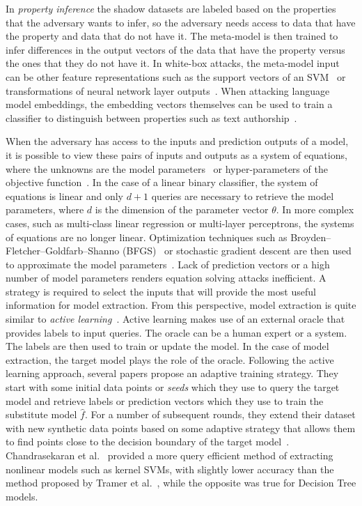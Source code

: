 In \textit{property inference} the shadow datasets are labeled based on the properties that the adversary wants to infer, so the adversary needs access to data that have the property and data that do not have it. The meta-model is then trained to infer differences in the output vectors of the data that have the property versus the ones that they do not have it. In white-box attacks, the meta-model input can be other feature representations such as the support vectors of an SVM~ or transformations of neural network layer outputs~. When attacking language model embeddings, the embedding vectors themselves can be used to train a classifier to distinguish between properties such as text authorship~.

When the adversary has access to the inputs and prediction outputs of a model, it is possible to view these pairs of inputs and outputs as a system of equations, where the unknowns are the model parameters~ or hyper-parameters of the objective function~. In the case of a linear binary classifier, the system of equations is linear and only $d + 1$ queries are necessary to retrieve the model parameters, where $d$ is the dimension of the parameter vector $\theta$. In more complex cases, such as multi-class linear regression or multi-layer perceptrons, the systems of equations are no longer linear. Optimization techniques such as Broyden–Fletcher–Goldfarb–Shanno (BFGS)~ or stochastic gradient descent are then used to approximate the model parameters~. 
Lack of prediction vectors or a high number of model parameters renders equation solving attacks inefficient. A strategy is required to select the inputs that will provide the most useful information for model extraction. From this perspective, model extraction is quite similar to \textit{active learning}~. Active learning makes use of an external 
oracle that provides labels to input queries. The oracle can be a human expert or a system. The labels are then used to train or update the model. In the case of model extraction, the target model plays the role of the oracle.
Following the active learning approach, several papers propose an adaptive training strategy. They start with some initial data points or \textit{seeds} which they use to query the target model and retrieve labels or prediction vectors which they use to train the substitute model $\hat{f}$. For a number of subsequent rounds, they extend their dataset with new synthetic data points based on some adaptive strategy that allows them to find points close to the decision boundary of the target model~. Chandrasekaran et al.~ provided a more query efficient method of extracting nonlinear models such as kernel SVMs, with slightly lower accuracy than the method proposed by Tramer et al.~, while the opposite was true for Decision Tree models.
